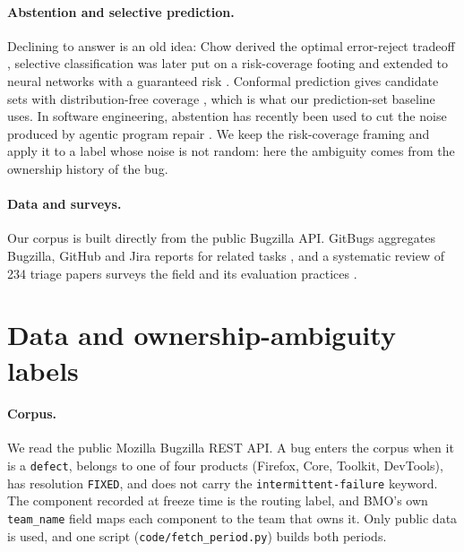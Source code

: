\documentclass[sigconf,anonymous]{acmart}
\begin{document}
\paragraph{Abstention and selective prediction.}
Declining to answer is an old idea: Chow derived the optimal error-reject tradeoff
\cite{chow1970optimum}, selective classification was later put on a risk-coverage footing
\cite{elyaniv2010foundations} and extended to neural networks with a guaranteed risk
\cite{geifman2017selective}. Conformal prediction gives candidate sets with distribution-free
coverage \cite{angelopoulos2021gentle}, which is what our prediction-set baseline uses. In software
engineering, abstention has recently been used to cut the noise produced by agentic program repair
\cite{cambronero2026abstain}. We keep the risk-coverage framing and apply it to a label whose noise
is not random: here the ambiguity comes from the ownership history of the bug.

\paragraph{Data and surveys.}
Our corpus is built directly from the public Bugzilla API. GitBugs aggregates Bugzilla, GitHub and
Jira reports for related tasks \cite{patil2025gitbugs}, and a systematic review of 234 triage
papers surveys the field and its evaluation practices \cite{zhao2025triage}.

\section{Data and ownership-ambiguity labels}
\label{sec:data}


\paragraph{Corpus.}
We read the public Mozilla Bugzilla REST API. A bug enters the corpus when it is a
\texttt{defect}, belongs to one of four products (Firefox, Core, Toolkit, DevTools), has
resolution \texttt{FIXED}, and does not carry the \texttt{intermittent-failure} keyword. The
component recorded at freeze time is the routing label, and BMO's own \texttt{team\_name} field
maps each component to the team that owns it. Only public data is used, and one script
(\texttt{code/fetch\_period.py}) builds both periods.
\end{document}
